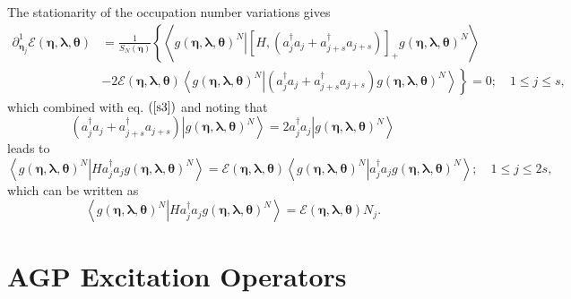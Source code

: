 \documentclass[titlepage]{article}%
\begin{document}
The stationarity of the occupation number variations gives
\begin{align}
\partial_{\bm{\eta}_{j}}^{1}\mathcal{E}\left(
\bm{\eta},\bm{\lambda},\bm{\theta}\right)   &  =\frac{1}{S_{N}\left(
\bm{\eta}\right)  }\left\{  \left\langle \left.  g\left(
\bm{\eta },\bm{\lambda},\bm{\theta}\right)  ^{N}\right\vert \left[  H,\left(
a_{j}^{\dagger}a_{j}+a_{j+s}^{\dagger}a_{j+s}\right)  \right]  _{+}g\left(
\bm{\eta},\bm{\lambda},\bm{\theta}\right)  ^{N}\right\rangle \right.
\nonumber\\
&  -\left.  2\mathcal{E}\left(  \bm{\eta},\bm{\lambda},\bm{\theta }\right)
\left\langle \left.  g\left(  \bm{\eta},\bm{\lambda },\bm{\theta}\right)
^{N}\right\vert \left(  a_{j}^{\dagger}a_{j}+a_{j+s}^{\dagger}a_{j+s}\right)
g\left(  \bm{\eta},\bm{\lambda },\bm{\theta}\right)  ^{N}\right\rangle
\right\}  =0;\quad1\leq j\leq s,
\end{align}
which combined with eq. $\left(  \ref{s3}\right)  $ and noting that
\begin{equation}
\left(  a_{j}^{\dagger}a_{j}+a_{j+s}^{\dagger}a_{j+s}\right)  \left\vert
g\left(  \bm{\eta},\bm{\lambda},\bm{\theta}\right)  ^{N}\right\rangle
=2a_{j}^{\dagger}a_{j}\left\vert g\left(
\bm{\eta },\bm{\lambda},\bm{\theta}\right)  ^{N}\right\rangle
\end{equation}
leads to
\begin{equation}
\left\langle \left.  g\left(  \bm{\eta},\bm{\lambda},\bm{\theta }\right)
^{N}\right\vert Ha_{j}^{\dagger}a_{j}g\left(
\bm{\eta },\bm{\lambda},\bm{\theta}\right)  ^{N}\right\rangle =\mathcal{E}%
\left(  \bm{\eta},\bm{\lambda},\bm{\theta}\right)  \left\langle \left.
g\left(  \bm{\eta},\bm{\lambda},\bm{\theta}\right)  ^{N}\right\vert
a_{j}^{\dagger}a_{j}g\left(  \bm{\eta},\bm{\lambda },\bm{\theta}\right)
^{N}\right\rangle ;\quad1\leq j\leq2s,
\end{equation}
which can be written as
\begin{equation}
\left\langle \left.  g\left(  \bm{\eta},\bm{\lambda},\bm{\theta }\right)
^{N}\right\vert Ha_{j}^{\dagger}a_{j}g\left(
\bm{\eta },\bm{\lambda},\bm{\theta}\right)  ^{N}\right\rangle =\mathcal{E}%
\left(  \bm{\eta},\bm{\lambda},\bm{\theta}\right)  N_{j}.
\end{equation}


\section{AGP Excitation Operators\label{q_op}}
\end{document}
